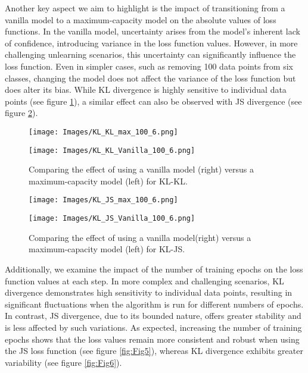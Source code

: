 \documentclass{article} %
\begin{document}
Another key aspect we aim to highlight is the impact of transitioning from a vanilla model to a maximum-capacity model on the absolute values of loss functions. In the vanilla model, uncertainty arises from the model's inherent lack of confidence, introducing variance in the loss function values. However, in more challenging unlearning scenarios, this uncertainty can significantly influence the loss function. Even in simpler cases, such as removing 100 data points from six classes, changing the model does not affect the variance of the loss function but does alter its bias. While KL divergence is highly sensitive to individual data points (see figure \ref{fig:Fig3}), a similar effect can also be observed with JS divergence (see figure \ref{fig:Fig4}).
\begin{figure}[H]
    \centering
     \vspace{-8pt}
    \begin{minipage}{0.45\textwidth}
        \centering
        \texttt{[image: Images/KL\_KL\_max\_100\_6.png]}
        \label{fig:image3_A}
    \end{minipage}
    \hfill
    \begin{minipage}{0.45\textwidth}
        \centering
        \texttt{[image: Images/KL\_KL\_Vanilla\_100\_6.png]}
        \label{fig:image3_B}
    \end{minipage}
    \caption{Comparing the effect of using a vanilla model (right) versus a maximum-capacity model (left) for KL-KL.}
    \label{fig:Fig3}
\end{figure}
\begin{figure}[H]
    \centering
     \vspace{-16pt}
    \begin{minipage}{0.45\textwidth}
        \centering
        \texttt{[image: Images/KL\_JS\_max\_100\_6.png]}
        \label{fig:image4_A}
    \end{minipage}
    \hfill
    \begin{minipage}{0.45\textwidth}
        \centering
        \texttt{[image: Images/KL\_JS\_Vanilla\_100\_6.png]}
        \label{fig:image4_B}
    \end{minipage}
    \caption{Comparing the effect of using a vanilla model(right) versus a maximum-capacity model (left) for KL-JS.}
    \label{fig:Fig4}
\end{figure}
Additionally, we examine the impact of the number of training epochs on the loss function values at each step. In more complex and challenging scenarios, KL divergence demonstrates high sensitivity to individual data points, resulting in significant fluctuations when the algorithm is run for different numbers of epochs. In contrast, JS divergence, due to its bounded nature, offers greater stability and is less affected by such variations. As expected, increasing the number of training epochs shows that the loss values remain more consistent and robust when using the JS loss function (see figure \ref{fig:Fig5}), whereas KL divergence exhibits greater variability (see figure \ref{fig:Fig6}).
\end{document}
